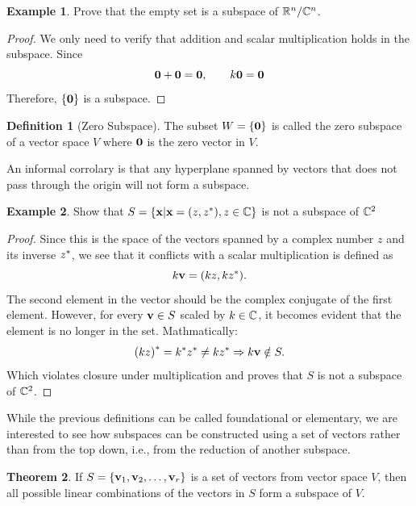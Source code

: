 \documentclass[12pt]{article}
\theoremstyle{definition}
\newtheorem{theorem}{Theorem}[section]
\newtheorem{definition}[theorem]{Definition}
\newtheorem*{example}{Example}
\begin{document}
\begin{example}
    Prove that the empty set is a subspace of $\mathbb{R}^n/\mathbb{C}^n$. 
\end{example}

\begin{proof}
    We only need to verify that addition and scalar multiplication holds in the subspace. Since $$\mathbf{0} + \mathbf{0} = \mathbf{0}, \qquad k\mathbf{0} = \mathbf{0}$$
    Therefore, $\{\mathbf{0}\}$ is a subspace. 
\end{proof}

\begin{definition}[Zero Subspace]
    The subset $W = \{\mathbf{0}\}$ is called the zero subspace of a vector space $V$ where $\mathbf{0}$ is the zero vector in $V$.
\end{definition}

An informal corrolary is that any hyperplane spanned by vectors that does not pass through the origin will not form a subspace. 

\begin{example}
    Show that $S = \{\mathbf{x} \vert \mathbf{x} = (z, {z}^*), z \in \mathbb{C}\}$ is not a subspace of $\mathbb{C}^2$
\end{example}

\begin{proof}
    Since this is the space of the vectors spanned by a complex number $z$ and its inverse ${z}^*$, we see that it conflicts with a scalar multiplication is defined as $$k \mathbf{v} = (kz, k {z}^*).$$
    The second element in the vector should be the complex conjugate of the first element. However, for every $\mathbf{v} \in S$ scaled by $k \in \mathbb{C}$, it becomes evident that the element is no longer in the set. Mathmatically: $${(kz)}^* = {k}^*{z}^* \neq k {z}^* \Rightarrow k \mathbf{v} \notin S.$$
    Which violates closure under multiplication and proves that $S$ is not a subspace of $\mathbb{C}^2$.
\end{proof}

While the previous definitions can be called foundational or elementary, we are interested to see how subspaces can be constructed using a set of vectors rather than from the top down, i.e., from the reduction of another subspace. 

\begin{theorem}
    If $S = \{\mathbf{v}_1, \mathbf{v}_2, \ldots, \mathbf{v}_r\}$ is a set of vectors from vector space $V$, then all possible linear combinations of the vectors in $S$ form a subspace of $V$. 
\end{theorem}
\end{document}
